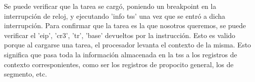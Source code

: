 Se puede verificar que la tarea se cargó, poniendo un breakpoint en la interrupción de reloj, y ejecutando 'info tss' una vez que se entró a dicha interrupción. Para confirmar que la tarea es la que nosotros queremos, se puede verificar el 'eip', 'cr3', 'tr', 'base' devueltos por la instrucción. 
Esto es valido porque al cargarse una tarea, el procesador levanta el contexto de la misma. Esto significa que pasa toda la información almacenada en la tss a los registros de contexto corresponientes, como ser los registros de propocito general, los de segmento, etc.